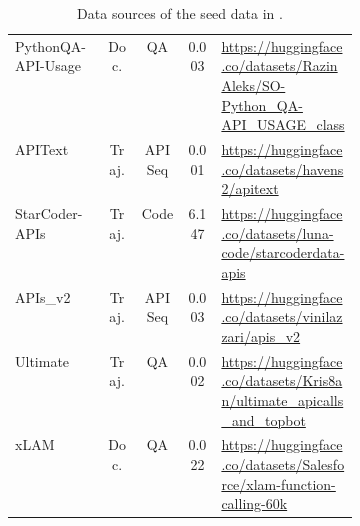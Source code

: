 \begin{table*}[ht]
\begin{tabular}{@{}lcccp{0.4\linewidth}@{}}
PythonQA-API-Usage & Doc. & QA & 0.003 & \url{https://huggingface.co/datasets/RazinAleks/SO-Python_QA-API_USAGE_class} \\
APIText & Traj. & API Seq & 0.001 & \url{https://huggingface.co/datasets/havens2/apitext} \\
StarCoder-APIs~\cite{lozhkov2024starcoder} & Traj. & Code & 6.147 & \url{https://huggingface.co/datasets/luna-code/starcoderdata-apis} \\
APIs\_v2 & Traj. & API Seq & 0.003 & \url{https://huggingface.co/datasets/vinilazzari/apis_v2} \\
Ultimate & Traj. & QA & 0.002 & \url{https://huggingface.co/datasets/Kris8an/ultimate_apicalls_and_topbot}\\
xLAM~\cite{zhang2024xlam} & Doc. & QA & 0.022 & \url{https://huggingface.co/datasets/Salesforce/xlam-function-calling-60k} \\\bottomrule
\end{tabular}
\caption{Data sources of the seed data in \dataset. }
\label{tab:data-source1}
\end{table*}

